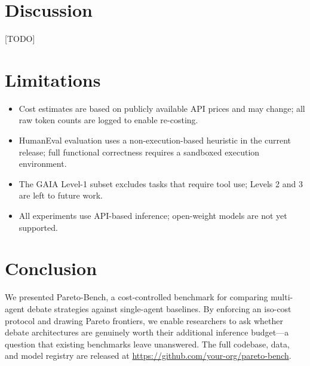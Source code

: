 \documentclass[11pt]{article}
\begin{document}
\section{Discussion}

[TODO]

\section{Limitations}

\begin{itemize}
    \item Cost estimates are based on publicly available API prices and may
          change; all raw token counts are logged to enable re-costing.
    \item HumanEval evaluation uses a non-execution-based heuristic in the
          current release; full functional correctness requires a sandboxed
          execution environment.
    \item The GAIA Level-1 subset excludes tasks that require tool use;
          Levels 2 and 3 are left to future work.
    \item All experiments use API-based inference; open-weight models are
          not yet supported.
\end{itemize}

\section{Conclusion}

We presented Pareto-Bench, a cost-controlled benchmark for comparing
multi-agent debate strategies against single-agent baselines.  By enforcing an
iso-cost protocol and drawing Pareto frontiers, we enable researchers to ask
whether debate architectures are genuinely worth their additional inference
budget---a question that existing benchmarks leave unanswered.  The full
codebase, data, and model registry are released at
\url{https://github.com/your-org/pareto-bench}.



\end{document}
